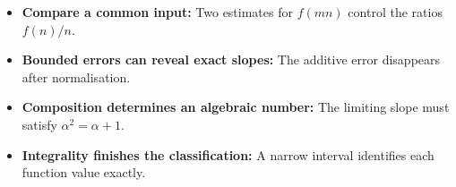 \begin{takeaways}
\begin{itemize}
\item \textbf{Compare a common input:} Two estimates for \(f(mn)\) control the ratios \(f(n)/n\).
\item \textbf{Bounded errors can reveal exact slopes:} The additive error disappears after normalisation.
\item \textbf{Composition determines an algebraic number:} The limiting slope must satisfy \(\alpha^2=\alpha+1\).
\item \textbf{Integrality finishes the classification:} A narrow interval identifies each function value exactly.
\end{itemize}
\end{takeaways}
